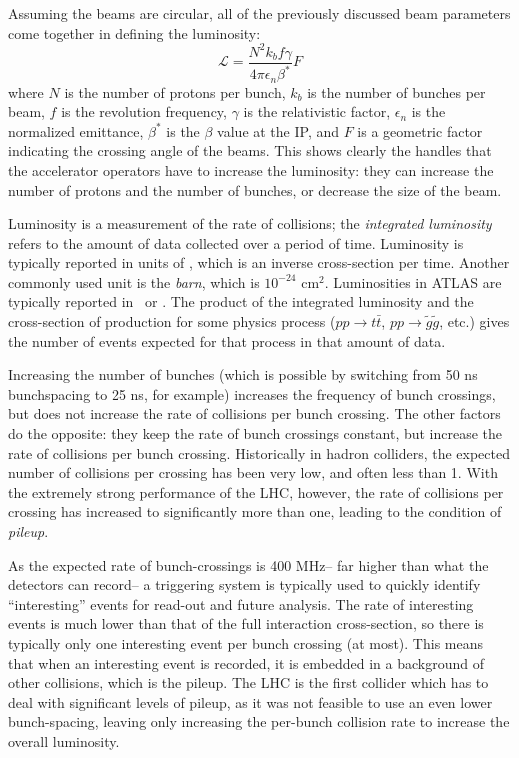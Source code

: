 Assuming the beams are circular, all of the previously discussed beam parameters come together in defining the luminosity:
%
\begin{equation}
\mathcal{L} = \frac{N^2 k_b f \gamma}{4\pi \epsilon_n \beta^*} F
\end{equation}
%
where $N$ is the number of protons per bunch, $k_b$ is the number of bunches per beam, $f$ is the revolution frequency, $\gamma$ is the relativistic factor, $\epsilon_n$ is the normalized emittance, $\beta^*$ is the $\beta$ value at the IP, and $F$ is a geometric factor indicating the crossing angle of the beams. This shows clearly the handles that the accelerator operators have to increase the luminosity: they can increase the number of protons and the number of bunches, or decrease the size of the beam.

Luminosity is a measurement of the rate of collisions; the \textit{integrated luminosity} refers to the amount of data collected over a period of time. Luminosity is typically reported in units of \lumirate, which is an inverse cross-section per time. Another commonly used unit is the \textit{barn}, which is $10^{-24}$ cm$^2$. Luminosities in ATLAS are typically reported in \ipb~or \ifb. The product of the integrated luminosity and the cross-section of production for some physics process ($pp \rightarrow t\bar{t}$, $pp \rightarrow \tilde{g}\tilde{g}$, etc.) gives the number of events expected for that process in that amount of data.

Increasing the number of bunches (which is possible by switching from 50 ns bunchspacing to 25 ns, for example) increases the frequency of bunch crossings, but does not increase the rate of collisions per bunch crossing. The other factors do the opposite: they keep the rate of bunch crossings constant, but increase the rate of collisions per bunch crossing. Historically in hadron colliders, the expected number of collisions per crossing has been very low, and often less than 1. With the extremely strong performance of the LHC, however, the rate of collisions per crossing has increased to significantly more than one, leading to the condition of \textit{pileup}.

As the expected rate of bunch-crossings is 400 MHz-- far higher than what the detectors can record-- a triggering system is typically used to quickly identify ``interesting'' events for read-out and future analysis. The rate of interesting events is much lower than that of the full interaction cross-section, so there is typically only one interesting event per bunch crossing (at most). This means that when an interesting event is recorded, it is embedded in a background of other collisions, which is the pileup. The LHC is the first collider which has to deal with significant levels of pileup, as it was not feasible to use an even lower bunch-spacing, leaving only increasing the per-bunch collision rate to increase the overall luminosity.

